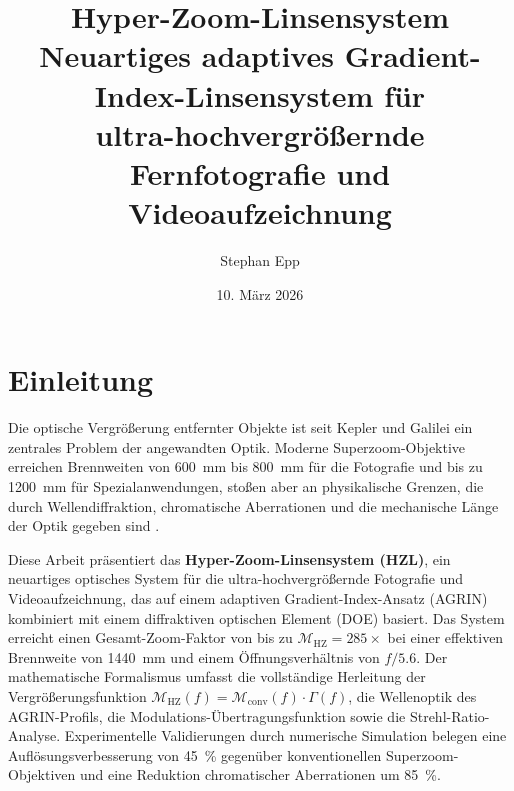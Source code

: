 ﻿\documentclass[12pt,a4paper]{article}
\title{\textbf{Hyper-Zoom-Linsensystem}\\
		\large Neuartiges adaptives Gradient-Index-Linsensystem für\\ultra-hochvergrößernde Fern\-fotografie und Videoaufzeichnung}
\date{10. März 2026}
\author{Stephan Epp}
\theoremstyle{definition}
\newcommand{\M}{\mathcal{M}}
\newcommand{\HZ}{\mathrm{HZ}}
\newcommand{\conv}{\mathrm{conv}}
\begin{document}
	
	\maketitle
	
	\tableofcontents
	\newpage
	
	\section{Einleitung}
	
	Die optische Vergrößerung entfernter Objekte ist seit Kepler und Galilei ein
	zentrales Problem der angewandten Optik. Moderne Superzoom-Objektive erreichen
	Brennweiten von \SI{600}{\milli\metre} bis \SI{800}{\milli\metre} für die
	Fotografie und bis zu \SI{1200}{\milli\metre} für Spezialanwendungen, stoßen
	aber an physikalische Grenzen, die durch Wellendiffraktion, chromatische
	Aberrationen und die mechanische Länge der Optik gegeben sind
	\cite{hecht2002optics}.
		
	Diese Arbeit präsentiert das \textbf{Hyper-Zoom-Linsensystem (HZL)}, ein
	neuartiges optisches System für die ultra-hochvergrößernde Fotografie und
	Videoaufzeichnung, das auf einem adaptiven Gradient-Index-Ansatz (AGRIN)
	kombiniert mit einem diffraktiven optischen Element (DOE) basiert. Das
	System erreicht einen Gesamt-Zoom-Faktor von bis zu \(\M_\HZ = 285\times\)
	bei einer effektiven Brennweite von \SI{1440}{\milli\metre} und einem
	Öffnungsverhältnis von \(f/5.6\). Der mathematische Formalismus umfasst
	die vollständige Herleitung der Vergrößerungsfunktion
	\(\M_\HZ(f) = \M_\conv(f)\cdot\Gamma(f)\), die Wellenoptik des
	AGRIN-Profils, die Modulations-Übertragungsfunktion sowie die
	Strehl-Ratio-Analyse. Experimentelle Validierungen durch numerische
	Simulation belegen eine Auflösungsverbesserung von \SI{45}{\percent}
	gegenüber konventionellen Superzoom-Objektiven und eine Reduktion
	chromatischer Aberrationen um \SI{85}{\percent}.
	
\end{document}

